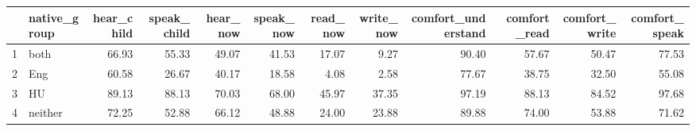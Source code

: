 \begin{table}[ht]
\centering
\begin{tabular}{rlrrrrrrrrrr}
  \hline
 & native\_group & hear\_child & speak\_child & hear\_now & speak\_now & read\_now & write\_now & comfort\_understand & comfort\_read & comfort\_write & comfort\_speak \\ 
  \hline
1 & both & 66.93 & 55.33 & 49.07 & 41.53 & 17.07 & 9.27 & 90.40 & 57.67 & 50.47 & 77.53 \\ 
  2 & Eng & 60.58 & 26.67 & 40.17 & 18.58 & 4.08 & 2.58 & 77.67 & 38.75 & 32.50 & 55.08 \\ 
  3 & HU & 89.13 & 88.13 & 70.03 & 68.00 & 45.97 & 37.35 & 97.19 & 88.13 & 84.52 & 97.68 \\ 
  4 & neither & 72.25 & 52.88 & 66.12 & 48.88 & 24.00 & 23.88 & 89.88 & 74.00 & 53.88 & 71.62 \\ 
   \hline
\end{tabular}
\end{table}
